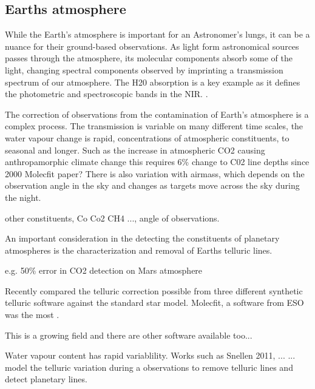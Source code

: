 \subsection{Earths atmosphere}
While the Earth's atmosphere is important for an Astronomer's lungs, it can be a nuance for their ground-based observations. As light form astronomical sources passes through the atmosphere, its molecular components absorb some of the light, changing spectral components observed  by imprinting a transmission spectrum of our atmosphere. The H20 absorption is a key example as it defines the photometric and spectroscopic bands in the NIR. .

The correction of observations from the contamination of Earth's atmosphere is a complex process. The transmission is variable on many different time scales, the water vapour change is rapid, concentrations of atmospheric constituents, to seasonal and longer. Such as the increase in atmospheric CO2 causing anthropamorphic climate change this requires 6\% change to C02 line depths since 2000 Molecfit paper? There is also variation with airmass, which depends on the observation angle in the sky and changes as targets move across the sky during the night. 

other constituents, Co Co2 CH4 ..., angle of observations.

An important consideration in the detecting the constituents of planetary atmospheres is the characterization and removal of Earths telluric lines.

e.g. 50\% error in CO2 detection on Mars atmosphere


Recently \citet{ulmer-moll_telluric_2018} compared the telluric correction possible from three different synthetic telluric software against the standard star model. Molecfit, a software from ESO was the most .

This is a growing field and there are other software available too... 


Water vapour content has rapid variablility. Works such as Snellen 2011, ... ...  model the telluric variation during a observations to remove telluric lines and detect planetary lines.

